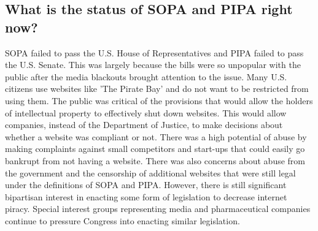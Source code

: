 \documentclass[11pt,journal,compsoc]{IEEEtran}
\begin{document}
\subsection{What is the status of SOPA and PIPA right now?}
SOPA failed to pass the U.S. House of Representatives and PIPA failed to pass the U.S. Senate. This was largely because the bills were so unpopular with the public after the media blackouts brought attention to the issue. Many U.S. citizens use websites like 'The Pirate Bay' and do not want to be restricted from using them. The public was critical of the provisions that would allow the holders of intellectual property to effectively shut down websites. This would allow companies, instead of the Department of Justice, to make decisions about whether a website was compliant or not. There was a high potential of abuse by making complaints against small competitors and start-ups that could easily go bankrupt from not having a website. There was also concerns about abuse from the government and the censorship of additional websites that were still legal under the definitions of SOPA and PIPA.
However, there is still significant bipartisan interest in enacting some form of legislation to decrease internet piracy. Special interest groups representing media and pharmaceutical companies continue to pressure Congress into enacting similar legislation. 
\end{document}

